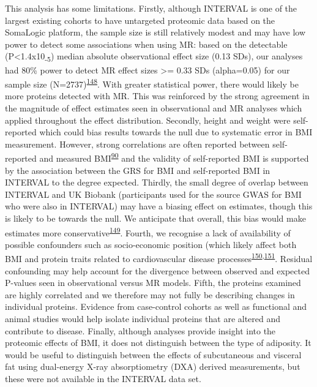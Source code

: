 \documentclass[11pt,twoside]{bristolthesis}
\begin{document}
This analysis has some limitations. Firstly, although INTERVAL is one of the largest existing cohorts to have untargeted proteomic data based on the SomaLogic platform, the sample size is still relatively modest and may have low power to detect some associations when using MR: based on the detectable (P\textless1.4x10\textsubscript{-5}) median absolute observational effect size (0.13 SDs), our analyses had 80\% power to detect MR effect sizes \textgreater= 0.33 SDs (alpha=0.05) for our sample size (N=2737)\textsuperscript{\protect\hyperlink{ref-Brion2013}{148}}. With greater statistical power, there would likely be more proteins detected with MR. This was reinforced by the strong agreement in the magnitude of effect estimates seen in observational and MR analyses which applied throughout the effect distribution. Secondly, height and weight were self-reported which could bias results towards the null due to systematic error in BMI measurement. However, strong correlations are often reported between self-reported and measured BMI\textsuperscript{\protect\hyperlink{ref-Nikolaou2017}{90}} and the validity of self-reported BMI is supported by the association between the GRS for BMI and self-reported BMI in INTERVAL to the degree expected. Thirdly, the small degree of overlap between INTERVAL and UK Biobank (participants used for the source GWAS for BMI who were also in INTERVAL) may have a biasing effect on estimates, though this is likely to be towards the null. We anticipate that overall, this bias would make estimates more conservative\textsuperscript{\protect\hyperlink{ref-Burgess2016}{149}}. Fourth, we recognise a lack of availability of possible confounders such as socio-economic position (which likely affect both BMI and protein traits related to cardiovascular disease processes\textsuperscript{\protect\hyperlink{ref-Rosengren2019}{150},\protect\hyperlink{ref-Tillmann2017}{151}}. Residual confounding may help account for the divergence between observed and expected P-values seen in observational versus MR models. Fifth, the proteins examined are highly correlated and we therefore may not fully be describing changes in individual proteins. Evidence from case-control cohorts as well as functional and animal studies would help isolate individual proteins that are altered and contribute to disease. Finally, although analyses provide insight into the proteomic effects of BMI, it does not distinguish between the type of adiposity. It would be useful to distinguish between the effects of subcutaneous and visceral fat using dual-energy X-ray absorptiometry (DXA) derived measurements, but these were not available in the INTERVAL data set.
\end{document}
